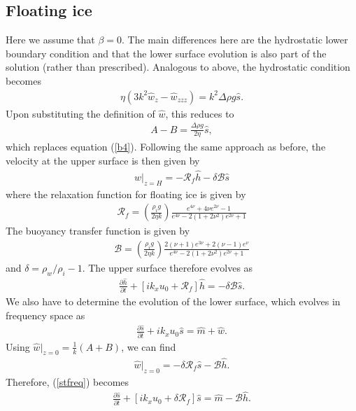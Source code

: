 \documentclass[paper=a4, fontsize=11pt]{article}
\begin{document}
\subsection*{Floating ice}
Here we assume that $\beta=0$.
The main differences here are the hydrostatic lower boundary condition
and that the lower surface evolution is also part of the solution (rather than prescribed).
Analogous to above, the hydrostatic condition becomes
\begin{align}
\eta (3k^2 \hat{w}_{z}-\hat{w}_{zzz})  = k^2 \Delta\rho g \hat{s}. \label{b4alt}
\end{align}
Upon substituting the definition of $\hat{w}$, this reduces to
\begin{align}
A-B = \frac{\Delta \rho g}{2\eta}\hat{s},
\end{align}
which replaces equation (\ref{b4}).
Following the same approach as before, the velocity at the upper surface is then given by
\begin{align}
w|_{z=H} =  -\mathcal{R}_f\hat{h} - \delta\mathcal{B}\hat{s}
\end{align}
where the relaxation function for floating ice is given by
\begin{align}
\mathcal{R}_f = \left(\frac{\rho_i g}{2\eta k}\right) \frac{e^{4\nu} +4\nu e^{2\nu} -1 }{e^{4\nu} -2(1+2\nu^2)e^{2\nu} +1}
\end{align}
The buoyancy transfer function is given by
\begin{align}
\mathcal{B} = \left(\frac{\rho_i g}{2\eta k}\right) \frac{ 2(\nu+1)e^{3\nu}+2(\nu-1)e^{\nu} }{e^{4\nu} -2(1+2\nu^2)e^{2\nu} +1}
\end{align}
and $\delta = \rho_w/\rho_i -1$.
The upper surface therefore evolves as
\begin{align}
\frac{\partial \hat{h}}{\partial t}+ \left[ik_xu_0  + \mathcal{R}_f\right]\hat{h} = -\delta\mathcal{B}\hat{s}.
\end{align}
We also have to determine the evolution of the lower surface, which evolves in frequency space as
\begin{align}
\frac{\partial \hat{s}}{\partial t}+ ik_xu_0 \hat{s} = \hat{m} + \hat{w}. \label{stfreq}
\end{align}
Using $\hat{w}|_{z=0}= \frac{1}{k}(A+B)$, we can find
\begin{align}
\hat{w}|_{z=0} = -\delta\mathcal{R}_f\hat{s} - \mathcal{B} \hat{h}.
\end{align}
Therefore, (\ref{stfreq}) becomes
\begin{align}
\frac{\partial \hat{s}}{\partial t}+ [ik_xu_0 + \delta\mathcal{R}_f]\hat{s} = \hat{m} - \mathcal{B} \hat{h}.
\end{align}
\end{document}
